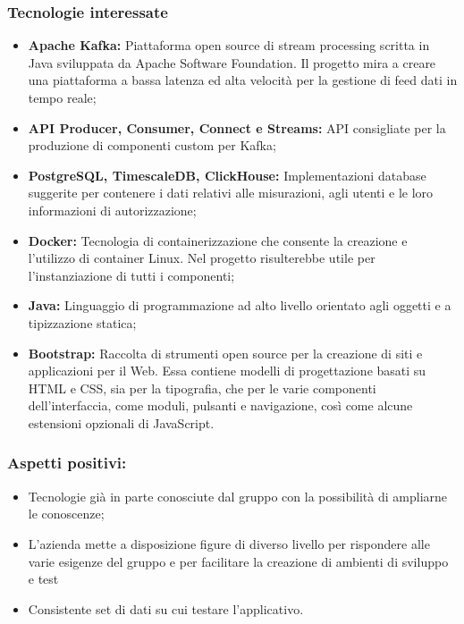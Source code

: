 	\subsubsection{Tecnologie interessate}
		\begin{itemize}
			\item \textbf{Apache Kafka:} Piattaforma open source di stream processing scritta in Java sviluppata da Apache Software Foundation. Il progetto mira a creare una piattaforma a bassa latenza ed alta velocità per la gestione di feed dati in tempo reale;
			\item \textbf{API Producer, Consumer, Connect e Streams:} API consigliate per la produzione di componenti custom per Kafka;
			\item \textbf{PostgreSQL, TimescaleDB, ClickHouse:} Implementazioni database suggerite per contenere i dati relativi alle misurazioni, agli utenti e le loro informazioni di autorizzazione;
			\item \textbf{Docker:} Tecnologia di containerizzazione che consente la creazione e l'utilizzo di container Linux. Nel progetto risulterebbe utile per l'instanziazione di tutti i componenti;   
			\item \textbf{Java:} Linguaggio di programmazione ad alto livello orientato agli oggetti e a tipizzazione statica;
			\item \textbf{Bootstrap:} Raccolta di strumenti open source per la creazione di siti e applicazioni per il Web. Essa contiene modelli di progettazione basati su HTML e CSS, sia per la tipografia, che per le varie componenti dell'interfaccia, come moduli, pulsanti e navigazione, così come alcune estensioni opzionali di JavaScript.
		\end{itemize}

	\subsubsection{Aspetti positivi:}
		\begin{itemize}
			\item Tecnologie già in parte conosciute dal gruppo con la possibilità di ampliarne le conoscenze;
			\item L'azienda mette a disposizione figure di diverso livello per rispondere alle varie esigenze del gruppo e per facilitare la creazione di ambienti di sviluppo e test
			\item Consistente set di dati su cui testare l'applicativo.
		\end{itemize}
	
